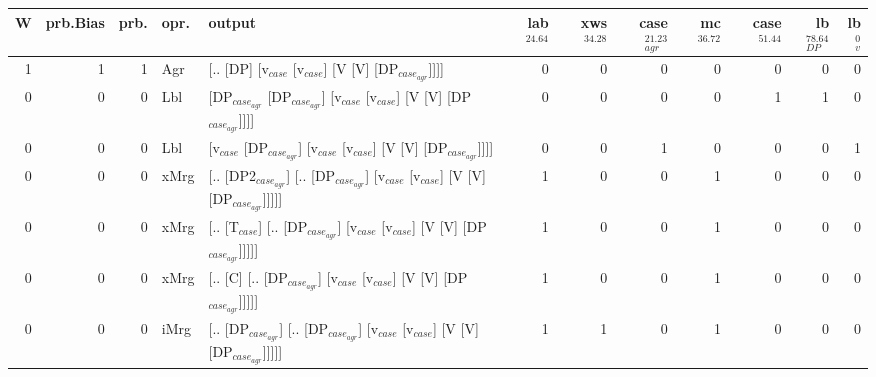 \begin{tabularx}{\linewidth}{rrrlXrrrrrrr}
\hline
   W &   prb.Bias &   prb. & opr.   & output                                                                                                  &   lab$^{24.64}$ &   xws$^{34.28}$ &   case$_{agr}^{21.23}$ &   mc$^{36.72}$ &   case$^{51.44}$ &   lb$_{DP}^{78.64}$ &   lb$_{v}^{0}$ \\
\hline
   1 &       1 &   1 & Agr  & [.. [DP] [v$_{case}$ [v$_{case}$] [V [V] [DP$_{case_{agr}}$]]]]                                                       &             0 &             0 &                  0 &            0 &              0 &               0 &             0 \\
   0 &       0 &   0 & Lbl  & [DP$_{case_{agr}}$ [DP$_{case_{agr}}$] [v$_{case}$ [v$_{case}$] [V [V] [DP$_{case_{agr}}$]]]]                                     &             0 &             0 &                  0 &            0 &              1 &               1 &             0 \\
   0 &       0 &   0 & Lbl  & [v$_{case}$ [DP$_{case_{agr}}$] [v$_{case}$ [v$_{case}$] [V [V] [DP$_{case_{agr}}$]]]]                                          &             0 &             0 &                  1 &            0 &              0 &               0 &             1 \\
   0 &       0 &   0 & xMrg & [.. [DP2$_{case_{agr}}$] [.. [DP$_{case_{agr}}$] [v$_{case}$ [v$_{case}$] [V [V] [DP$_{case_{agr}}$]]]]]                          &             1 &             0 &                  0 &            1 &              0 &               0 &             0 \\
   0 &       0 &   0 & xMrg & [.. [T$_{case}$] [.. [DP$_{case_{agr}}$] [v$_{case}$ [v$_{case}$] [V [V] [DP$_{case_{agr}}$]]]]]                                &             1 &             0 &                  0 &            1 &              0 &               0 &             0 \\
   0 &       0 &   0 & xMrg & [.. [C] [.. [DP$_{case_{agr}}$] [v$_{case}$ [v$_{case}$] [V [V] [DP$_{case_{agr}}$]]]]]                                     &             1 &             0 &                  0 &            1 &              0 &               0 &             0 \\
   0 &       0 &   0 & iMrg & [.. [DP$_{case_{agr}}$] [.. [DP$_{case_{agr}}$] [v$_{case}$ [v$_{case}$] [V [V] [DP$_{case_{agr}}$]]]]]                           &             1 &             1 &                  0 &            1 &              0 &               0 &             0 \\

\end{tabularx}
